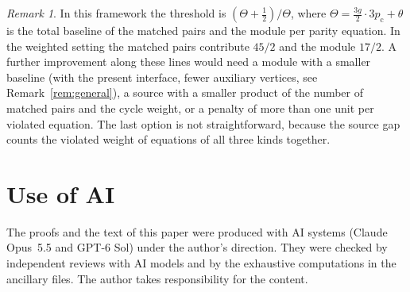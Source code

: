 \documentclass[11pt]{amsart}
\theoremstyle{definition}
\theoremstyle{remark}
\newtheorem{remark}[theorem]{Remark}
\numberwithin{equation}{section}
\newcommand{\pc}{p_{\mathrm{c}}}
\begin{document}
\begin{remark}
In this framework the threshold is $(\Theta+\frac12)/\Theta$, where $\Theta=\frac{3g}{2}\cdot3\pc+\theta$ is the total baseline of the matched pairs and the module per parity equation. In the weighted setting the matched pairs contribute $45/2$ and the module $17/2$. A further improvement along these lines would need a module with a smaller baseline (with the present interface, fewer auxiliary vertices, see Remark~\ref{rem:general}), a source with a smaller product of the number of matched pairs and the cycle weight, or a penalty of more than one unit per violated equation. The last option is not straightforward, because the source gap counts the violated weight of equations of all three kinds together.
\end{remark}

\section*{Use of AI}
The proofs and the text of this paper were produced with AI systems (Claude Opus~5.5 and GPT-6 Sol) under the author's direction. They were checked by independent reviews with AI models and by the exhaustive computations in the ancillary files. The author takes responsibility for the content.
\end{document}

